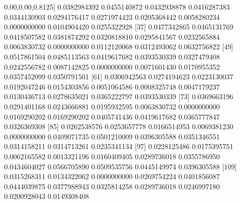\documentclass[10pt,]{krantz}
\makeatletter
\newenvironment{Shaded}{\begin{snugshade}}{\end{snugshade}}
\newcommand{\DecValTok}[1]{\textcolor[rgb]{0.00,0.00,0.81}{#1}}
\newcommand{\FloatTok}[1]{\textcolor[rgb]{0.00,0.00,0.81}{#1}}
\newcommand{\NormalTok}[1]{#1}
\newenvironment{kframe}{%
\medskip{}
\setlength{\fboxsep}{.8em}
 \def\at@end@of@kframe{}%
 \ifinner\ifhmode%
  \def\at@end@of@kframe{\end{minipage}}%
  \begin{minipage}{\columnwidth}%
 \fi\fi%
 \def\FrameCommand##1{\hskip\@totalleftmargin \hskip-\fboxsep
 \colorbox{shadecolor}{##1}\hskip-\fboxsep
     \hskip-\linewidth \hskip-\@totalleftmargin \hskip\columnwidth}%
 \MakeFramed {\advance\hsize-\width
   \@totalleftmargin\z@ \linewidth\hsize
   \@setminipage}}%
 {\par\unskip\endMakeFramed%
 \at@end@of@kframe}
\renewenvironment{Shaded}{\begin{kframe}}{\end{kframe}}
\makeatother
\begin{document}
\begin{Shaded}
\begin{Highlighting}[]
\NormalTok{ [}\DecValTok{25}\NormalTok{] }\FloatTok{0.0382984392} \FloatTok{0.0455140872} \FloatTok{0.0432938878} \FloatTok{0.0416287383} \FloatTok{0.0344130903} \FloatTok{0.0294176417} \FloatTok{0.0271974423} \FloatTok{0.0205368442} \FloatTok{0.0058280234} \FloatTok{0.0000000000} \FloatTok{0.0104904420} \FloatTok{0.0255322928}
\NormalTok{ [}\DecValTok{37}\NormalTok{] }\FloatTok{0.0477342865} \FloatTok{0.0465131769} \FloatTok{0.0418507582} \FloatTok{0.0381874292} \FloatTok{0.0320818810} \FloatTok{0.0295841567} \FloatTok{0.0232565884} \FloatTok{0.0063830732} \FloatTok{0.0000000000} \FloatTok{0.0112120068} \FloatTok{0.0312493062} \FloatTok{0.0632756822}
\NormalTok{ [}\DecValTok{49}\NormalTok{] }\FloatTok{0.0517861504} \FloatTok{0.0485113563} \FloatTok{0.0419617682} \FloatTok{0.0393530339} \FloatTok{0.0327479408} \FloatTok{0.0242556782} \FloatTok{0.0087142825} \FloatTok{0.0000000000} \FloatTok{0.0071601430} \FloatTok{0.0170955352} \FloatTok{0.0357452099} \FloatTok{0.0350791501}
\NormalTok{ [}\DecValTok{61}\NormalTok{] }\FloatTok{0.0306942563} \FloatTok{0.0274194623} \FloatTok{0.0223130037} \FloatTok{0.0192047246} \FloatTok{0.0154303856} \FloatTok{0.0051064586} \FloatTok{0.0008325748} \FloatTok{0.0047179237} \FloatTok{0.0130436713} \FloatTok{0.0278635021} \FloatTok{0.0365222797} \FloatTok{0.0393530339}
\NormalTok{ [}\DecValTok{73}\NormalTok{] }\FloatTok{0.0369663196} \FloatTok{0.0291401168} \FloatTok{0.0243666881} \FloatTok{0.0195932595} \FloatTok{0.0063830732} \FloatTok{0.0000000000} \FloatTok{0.0169290202} \FloatTok{0.0169290202} \FloatTok{0.0405741436} \FloatTok{0.0419617682} \FloatTok{0.0365777847} \FloatTok{0.0326369308}
\NormalTok{ [}\DecValTok{85}\NormalTok{] }\FloatTok{0.0262538576} \FloatTok{0.0253657778} \FloatTok{0.0166514953} \FloatTok{0.0069381230} \FloatTok{0.0000000000} \FloatTok{0.0409071735} \FloatTok{0.0501210009} \FloatTok{0.0396305588} \FloatTok{0.0351346551} \FloatTok{0.0314158211} \FloatTok{0.0314713261} \FloatTok{0.0235341134}
\NormalTok{ [}\DecValTok{97}\NormalTok{] }\FloatTok{0.0228125486} \FloatTok{0.0175395751} \FloatTok{0.0062165582} \FloatTok{0.0013321196} \FloatTok{0.0160409405} \FloatTok{0.0289736018} \FloatTok{0.0355786950} \FloatTok{0.0434604027} \FloatTok{0.0566705890} \FloatTok{0.0509535756} \FloatTok{0.0445149974} \FloatTok{0.0396305588}
\NormalTok{[}\DecValTok{109}\NormalTok{] }\FloatTok{0.0315268311} \FloatTok{0.0134322062} \FloatTok{0.0000000000} \FloatTok{0.0269754224} \FloatTok{0.0401856087} \FloatTok{0.0444039875} \FloatTok{0.0377988943} \FloatTok{0.0325814258} \FloatTok{0.0289736018} \FloatTok{0.0246997180} \FloatTok{0.0200928043} \FloatTok{0.0149308408}

\end{Highlighting}
\end{Shaded}
\end{document}
